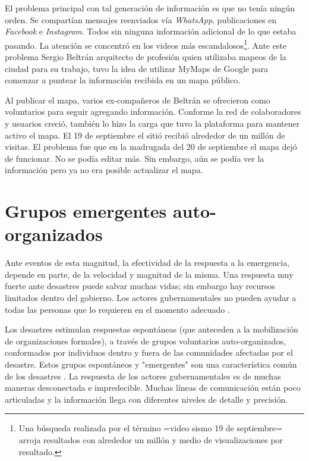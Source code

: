 \documentclass[12pt,spanish,oneside,breaklinks]{book}
\begin{document}
El problema principal con tal generación de información es que no tenía ningún orden. Se compartían mensajes reenviados vía \emph{WhatsApp}, publicaciones en \emph{Facebook} e \emph{Instagram}. Todos sin ninguna información adicional de lo que estaba pasando. La  atención se concentró en los videos más escandalosos\footnote{Una búsqueda realizada por el término =video sismo 19 de septiembre= arroja resultados con alrededor un millón y medio de visualizaciones por resultado.}. Ante este problema Sergio Beltrán arquitecto de profesión quien utilizaba mapeos de la ciudad para su trabajo, tuvo la idea de utilizar MyMaps de Google\cite{mymap} para comenzar a puntear la información recibida en un mapa público.

Al publicar el mapa, varios ex-compañeros de Beltrán se ofrecieron como voluntarios para seguir agregando información. Conforme la red de colaboradores y usuarios creció, también lo hizo la carga que tuvo la plataforma para mantener activo el mapa. El 19 de septiembre el sitió recibió alrededor de un millón de visitas. El problema fue que en la madrugada del 20 de septiembre el mapa dejó de funcionar. No se podía editar más. Sin embargo,  aún se podía ver la información pero ya no era posible actualizar el mapa.

\section{Grupos emergentes auto-organizados}
\label{sec:org2f13d98}

Ante eventos de esta magnitud, la efectividad de la respuesta a la emergencia, depende en parte, de la velocidad y magnitud de la misma. Una respuesta muy fuerte ante desastres puede salvar muchas vidas; sin embargo hay recursos limitados dentro del gobierno. Los actores gubernamentales no pueden ayudar a todas las personas que lo requieren en el momento adecuado \cite{flood}.

Los desastres estimulan respuestas espontáneas (que anteceden a la mobilización de organizaciones formales), a través de grupos voluntarios auto-organizados, conformados por individuos dentro y fuera de las comunidades afectadas por el desastre. Estos grupos espontáneos y "emergentes"  son una característica común de los desastres  \cite{emergentgroups}. La respuesta de los actores gubernamentales es de muchas maneras desconectada e impredecible. Muchas líneas de comunicación están poco articuladas y la información llega con diferentes niveles de detalle y precisión\cite{coord}.
\end{document}
